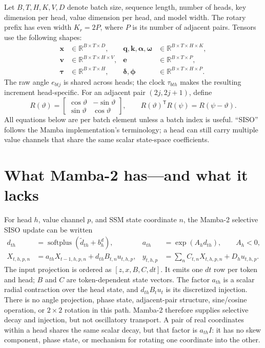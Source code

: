 \documentclass[11pt]{article}
\newcommand{\R}{\mathbb{R}}
\newcommand{\ve}[1]{\boldsymbol{#1}}
\newcommand{\tr}{\mathsf{T}}
\newcommand{\splus}{\operatorname{softplus}}
\begin{document}
Let $B,T,H,K,V,D$ denote batch size, sequence length, number of heads, key dimension per
head, value dimension per head, and model width.  The rotary prefix has even width $K_r=2P$,
where $P$ is its number of adjacent pairs.  Tensors use the following shapes:
\begin{align*}
  \ve{x}&\in\R^{B\times T\times D},
  &\ve{q},\ve{k},\ve{\alpha},\ve{\omega}
    &\in\R^{B\times T\times H\times K},\\
  \ve{v}&\in\R^{B\times T\times H\times V},
  &\ve{e}&\in\R^{B\times T\times P},\\
  \ve{\tau}&\in\R^{B\times T\times H},
  &\ve{\delta},\ve{\phi}&\in\R^{B\times T\times H\times P}.
\end{align*}
The raw angle $e_{btj}$ is shared across heads; the clock $\tau_{bth}$ makes the resulting
increment head-specific.  For an adjacent pair $(2j,2j+1)$, define
\begin{equation}
  R(\vartheta)=
  \begin{bmatrix}
    \cos\vartheta&-\sin\vartheta\\
    \sin\vartheta& \cos\vartheta
  \end{bmatrix},
  \qquad R(\vartheta)^{\tr}R(\psi)=R(\psi-\vartheta).
  \label{eq:rotation}
\end{equation}
All equations below are per batch element unless a batch index is useful.  ``SISO'' follows the
Mamba implementation's terminology; a head can still carry multiple value channels that share
the same scalar state-space coefficients.

\section{What Mamba-2 has---and what it lacks}
\label{sec:mamba2}

For head $h$, value channel $p$, and SSM state coordinate $n$, the Mamba-2 selective SISO update
can be written
\begin{align}
  d_{th} &= \splus(\widetilde d_{th}+b^{d}_h),
  & a_{th}&=\exp(A_h d_{th}),\qquad A_h<0,\label{eq:m2-dt}\\
  X_{t,h,p,n}
    &=a_{th}X_{t-1,h,p,n}+d_{th}B_{t,n}u_{t,h,p},
  & y_{t,h,p}&=\sum_n C_{t,n}X_{t,h,p,n}+D_hu_{t,h,p}.
  \label{eq:m2-state}
\end{align}
The input projection is ordered as $[z,x,B,C,dt]$.  It emits one $dt$ row per token and head;
$B$ and $C$ are token-dependent state vectors.  The factor $a_{th}$ is a scalar radial contraction
over the head state, and $d_{th}B_tu_t$ is its discretized injection.  There is no angle projection,
phase state, adjacent-pair structure, sine/cosine operation, or $2\times2$ rotation in this path.
Mamba-2 therefore supplies selective decay and injection, but not oscillatory transport.  A pair
of real coordinates within a head shares the same scalar decay, but that factor is $a_{th}I$: it
has no skew component, phase state, or mechanism for rotating one coordinate into the other.
\end{document}
